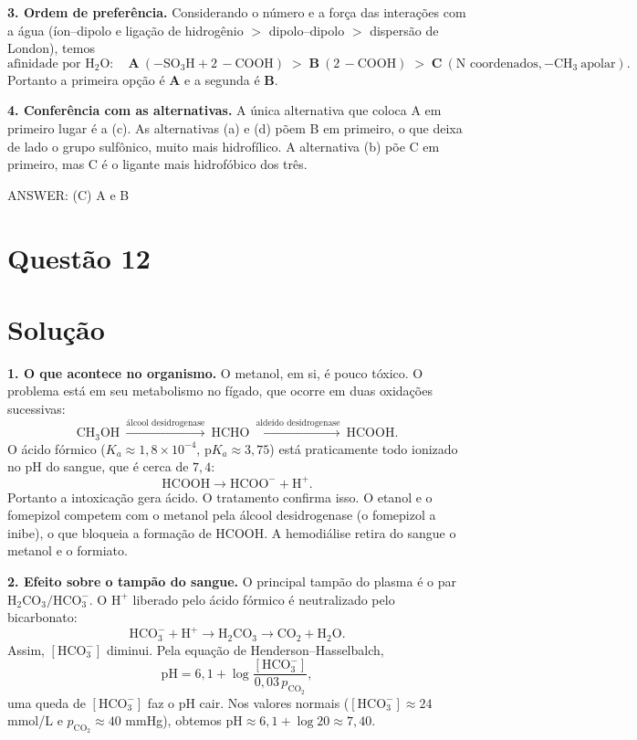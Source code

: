 \documentclass{article}%
\begin{document}
\textbf{3. Ordem de preferência.} Considerando o número e a força das interações com a água (íon--dipolo e ligação de hidrogênio $>$ dipolo--dipolo $>$ dispersão de London), temos
\[
\text{afinidade por } \mathrm{H_2O}:\quad \mathbf{A}\ (-\mathrm{SO_3H} + 2\,-\mathrm{COOH}) \;>\; \mathbf{B}\ (2\,-\mathrm{COOH}) \;>\; \mathbf{C}\ (\text{N coordenados}, -\mathrm{CH_3}\ \text{apolar}).
\]
Portanto a primeira opção é \textbf{A} e a segunda é \textbf{B}.

\textbf{4. Conferência com as alternativas.} A única alternativa que coloca A em primeiro lugar é a (c). As alternativas (a) e (d) põem B em primeiro, o que deixa de lado o grupo sulfônico, muito mais hidrofílico. A alternativa (b) põe C em primeiro, mas C é o ligante mais hidrofóbico dos três.

ANSWER: (C) A e B%
\newpage%
\section*{Questão 12}

\section*{Solução}

\textbf{1. O que acontece no organismo.} O metanol, em si, é pouco tóxico. O problema está em seu metabolismo no fígado, que ocorre em duas oxidações sucessivas:
\[
\mathrm{CH_3OH}\ \xrightarrow{\text{álcool desidrogenase}}\ \mathrm{HCHO}\ \xrightarrow{\text{aldeído desidrogenase}}\ \mathrm{HCOOH}.
\]
O ácido fórmico ($K_a \approx 1{,}8\times10^{-4}$, $\mathrm{p}K_a\approx 3{,}75$) está praticamente todo ionizado no pH do sangue, que é cerca de $7{,}4$:
\[
\mathrm{HCOOH} \longrightarrow \mathrm{HCOO^-} + \mathrm{H^+}.
\]
Portanto a intoxicação gera ácido. O tratamento confirma isso. O etanol e o fomepizol competem com o metanol pela álcool desidrogenase (o fomepizol a inibe), o que bloqueia a formação de $\mathrm{HCOOH}$. A hemodiálise retira do sangue o metanol e o formiato.

\textbf{2. Efeito sobre o tampão do sangue.} O principal tampão do plasma é o par $\mathrm{H_2CO_3/HCO_3^-}$. O $\mathrm{H^+}$ liberado pelo ácido fórmico é neutralizado pelo bicarbonato:
\[
\mathrm{HCO_3^-} + \mathrm{H^+} \longrightarrow \mathrm{H_2CO_3} \longrightarrow \mathrm{CO_2} + \mathrm{H_2O}.
\]
Assim, $[\mathrm{HCO_3^-}]$ diminui. Pela equação de Henderson--Hasselbalch,
\[
\mathrm{pH} = 6{,}1 + \log\frac{[\mathrm{HCO_3^-}]}{0{,}03\,p_{\mathrm{CO_2}}},
\]
uma queda de $[\mathrm{HCO_3^-}]$ faz o pH cair. Nos valores normais ($[\mathrm{HCO_3^-}]\approx 24$ mmol/L e $p_{\mathrm{CO_2}}\approx 40$ mmHg), obtemos $\mathrm{pH}\approx 6{,}1+\log 20\approx 7{,}40$.
\end{document}

